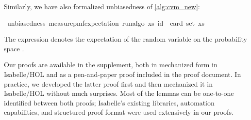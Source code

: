 Similarly, we have also formalized unbiasedness of \cref{alg:cvm_new}:
\begin{isabelle_cm}
\isamarkupfalse%
\ unbiasedness{\isacharcolon}{\kern0pt}\ {\isacartoucheopen}measure{\isacharunderscore}{\kern0pt}pmf{\isachardot}{\kern0pt}expectation\ {\isacharparenleft}{\kern0pt}run{\isacharunderscore}{\kern0pt}algo\ xs{\isacharparenright}{\kern0pt}\ id\ {\isacharequal}{\kern0pt}\ card\ {\isacharparenleft}{\kern0pt}set\ xs{\isacharparenright}{\kern0pt}{\isacartoucheclose}
\end{isabelle_cm}
The expression  denotes the expectation of the random variable  on the probability space .

Our proofs are available in the supplement, both in mechanized form in Isabelle/HOL and as a pen-and-paper proof included in the proof document.
In practice, we developed the latter proof first and then mechanized it in Isabelle/HOL without much surprises.
Most of the lemmas can be one-to-one identified between both proofs; Isabelle's existing libraries, automation capabilities, and structured proof format were used extensively in our proofs.



